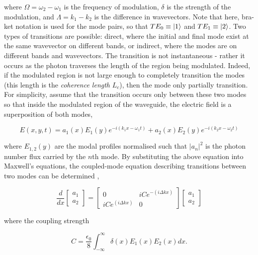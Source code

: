 where $\Omega = \omega_2 - \omega_1$ is the frequency of modulation, $\delta$ is the strength of the modulation, and $\Lambda = k_1-k_2$ is the difference in wavevectors. Note that here, bra-ket notation is used for the mode pairs, so that $TE_0 \equiv \ket{1}$ and $TE_1 \equiv \ket{2}$. Two types of transitions are possible: direct, where the initial and final mode exist at the same wavevector on different bands, or indirect, where the modes are on different bands and wavevectors. The transition is not instantaneous - rather it occurs as the photon traverses the length of the region being modulated. Indeed, if the modulated region is not large enough to completely transition the modes (this length is the \textit{coherence length} $L_c$), then the mode only partially transition. For simplicity, assume that the transition occurs only between these two modes so that inside the modulated region of the waveguide, the electric field is a superposition of both modes,

\begin{equation}
E(x,y,t) = a_1 (x) E_1 (y) e^{-i(k_1 x - \omega_1 t)} + a_2 (x) E_2 (y) e^{-i(k_2 x - \omega_2 t)}
\label{eq:fields}
\end{equation}

where $E_{1,2}(y)$ are the modal profiles normalised such that $|a_n|^2$ is the photon number flux carried by the $n$th mode. By substituting the above equation into Maxwell's equations, the coupled-mode equation describing transitions between two modes can be determined \cite{Yu2009a},

\begin{equation}
\dfrac{d}{dx} \begin{bmatrix}
a_1 \\
a_2
\end{bmatrix}
= 
\begin{bmatrix}
0 & i C e^{-(i \Delta k x)} \\
i C e^{(i \Delta k x)} & 0 
\end{bmatrix}
\begin{bmatrix}
a_1 \\
a_2
\end{bmatrix}
\label{eqn:cmt}
\end{equation}

where the coupling strength 

\begin{equation}
C = \dfrac{\epsilon_0}{8} \int_{-\infty}^{\infty} \delta(x) E_1(x) E_2(x) dx.
\end{equation}

